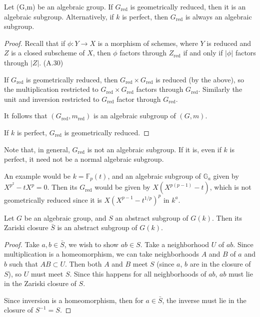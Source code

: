 \documentclass{memoir}
\begin{document}
\begin{proposition}[1.38-1.39]
	Let (G,m) be an algebraic group. If $G_{\text{red}}$ is geometrically
	reduced, then it is an algebraic subgroup. Alternatively, if $k$ is
	perfect, then $G_{\text{red}}$ is always an algebraic subgroup.
\end{proposition}

\begin{proof}
	Recall that if $\phi: Y \to X$ is a morphism of schemes, where $Y$
	is reduced and $Z$ is a closed subscheme of $X$, then $\phi$ factors
	through $Z_{\text{red}}$ if and only if $|\phi|$ factors through $|Z|$.
	(A.30)
	
	If $G_{\text{red}}$ is geometrically reduced, then
	$G_{\text{red}}\times G_{\text{red}}$ is reduced (by the above), so
	the multiplication restricted to  $G_{\text{red}}\times G_{\text{red}}$
	factors through $G_{\text{red}}$. Similarly the unit and inversion
	restricted to $G_{\text{red}}$ factor through $G_{\text{red}}$.
	
	It follows that $(G_{\text{red}}, m_{\text{red}})$ is an algebraic
	subgroup of $(G,m)$.
	
	If $k$ is perfect, $G_{\text{red}}$ is geometrically reduced.
\end{proof}

Note that, in general, $G_{\text{red}}$ is not an algebraic subgroup.
If it is, even if $k$ is perfect, it need not be a normal algebraic
subgroup.

An example would be $k=\mathbb{F}_p(t)$, and an algebraic subgroup of
$\mathbb{G}_a$ given by $X^{p^2}-tX^p = 0$. Then its $G_{\text{red}}$ would
be given by $X(X^{p(p-1)}-t)$, which is not geometrically reduced since
it is $X(X^{p-1}-t^{1/p})^p$ in $k^a$.

\begin{lemma}[1.40]
	Let $G$ be an algebraic group, and $S$ an abstract subgroup of $G(k)$.
	Then its Zariski closure $\bar S$ is an abstract subgroup of $G(k)$.
\end{lemma}
\begin{proof}
	Take $a,b\in \bar S$, we wish to show $ab\in S$. Take a neighborhood
	$U$ of $ab$. Since multiplication is a homeomorphism, we can take
	neighborhoods $A$ and $B$ of $a$ and $b$ such that $AB\subset U$. Then
	both $A$ and $B$ meet $S$ (since $a$, $b$ are in the closure of $S$),
	so $U$ must meet $S$. Since this happens for all neighborhoods of $ab$,
	$ab$ must lie in the Zariski closure of $S$.
	
	Since inversion is a homeomorphism, then for $a \in \bar S$, the
	inverse must lie in the closure of $S^{-1}=S$.
\end{proof}
\end{document}
